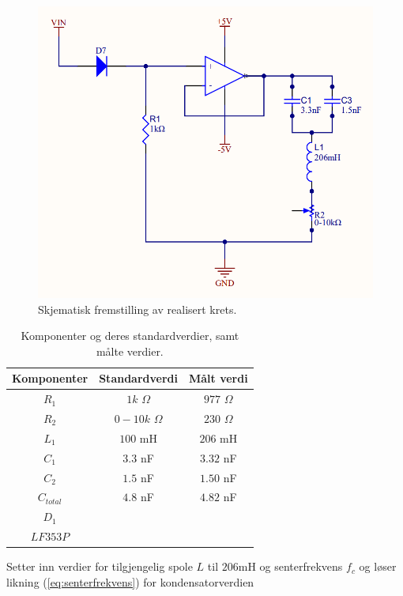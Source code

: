 \documentclass[a4paper,11pt,norsk]{article}
\begin{document}
\begin{figure}[H]
  \centering
  \includegraphics[scale=0.65]{D1/Images/altium.png}
  \caption{Skjematisk fremstilling av realisert krets.}
  \label{fig:schematic}
\end{figure}

\begin{table}[h]
  \centering
  \caption{Komponenter og deres standardverdier, samt målte verdier.}
  \label{tab:komp}
  \begin{tabular}{|c|c|c|}
    \hline\hline
    Komponenter & Standardverdi & Målt verdi \\
    \hline\hline
    $R_1$   & $1k$ $\Omega$ & $977$ $\Omega$\\
    \hline
    $R_2$   & $0-10k$ $\Omega$ & $230$ $\Omega$\\
    \hline
    $L_1$   & $100$ mH       & $206$ mH\\
    \hline
    $C_1$   & $3.3$ nF       & $3.32$ nF\\
    \hline
    $C_2$   & $1.5$ nF       & $1.50$ nF\\
    \hline
    $C_{total}$   & $4.8$ nF       & $4.82$ nF\\
    \hline\hline
    $D_1$          && \\
    \hline
    $LF353P$&&\\
    \hline
  \end{tabular}
\end{table}

Setter inn verdier for tilgjengelig spole $L$ til $206\mathrm{mH}$ og senterfrekvens $f_c$  og løser likning (\ref{eq:senterfrekvens}) for kondensatorverdien
\end{document}
